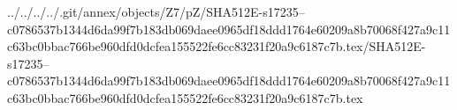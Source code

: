 ../../../../.git/annex/objects/Z7/pZ/SHA512E-s17235--c0786537b1344d6da99f7b183db069daee0965df18ddd1764e60209a8b70068f427a9c11c63bc0bbac766be960dfd0dcfea155522fe6cc83231f20a9c6187c7b.tex/SHA512E-s17235--c0786537b1344d6da99f7b183db069daee0965df18ddd1764e60209a8b70068f427a9c11c63bc0bbac766be960dfd0dcfea155522fe6cc83231f20a9c6187c7b.tex